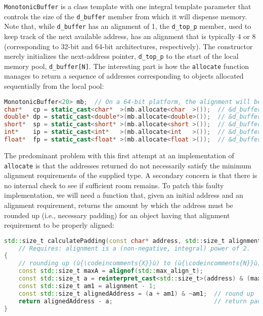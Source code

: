 \noindent \texttt{MonotonicBuffer} is a class template with one integral template
parameter that controls the size of the \texttt{d\_buffer} member from
which it will dispense memory. Note that, while \texttt{d\_buffer} has
an alignment of 1, the \texttt{d\_top\_p} member, used to keep track of
the next available address, has an alignment that is typically 4 or 8
(corresponding to 32-bit and 64-bit architectures, respectively). The
constructor merely initializes the next-address pointer,
\texttt{d\_top\_p} to the start of the local memory pool,
\texttt{d\_buffer[N]}. The interesting part is how the \texttt{allocate}
function manages to return a sequence of addresses corresponding to
objects allocated sequentially from the local pool:

\begin{lstlisting}[language=C++]
MonotonicBuffer<20> mb;  // On a 64-bit platform, the alignment will be 8.
char*   cp = static_cast<char*  >(mb.allocate<char  >());  // &d_buffer[ 0]
double* dp = static_cast<double*>(mb.allocate<double>());  // &d_buffer[ 1]
short*  sp = static_cast<short* >(mb.allocate<short >());  // &d_buffer[ 9]
int*    ip = static_cast<int*   >(mb.allocate<int   >());  // &d_buffer[11]
float*  fp = static_cast<float* >(mb.allocate<float >());  // &d_buffer[15]
\end{lstlisting}
    
\noindent The predominant problem with this first attempt at an implementation of
\texttt{allocate} is that the addresses returned do not necessarily
satisfy the minimum alignment requirements of the supplied type. A
secondary concern is that there is no internal check to see if
sufficient room remains. To patch this faulty implementation,
we will need a function that, given an initial address and an alignment
requirement, returns the amount by which the address must be rounded up
(i.e., necessary padding) for an object having that alignment
requirement to be properly aligned:

\begin{lstlisting}[language=C++]
std::size_t calculatePadding(const char* address, std::size_t alignment)
    // Requires: alignment is a (non-negative, integral) power of 2.
{
    // rounding up (ù{\codeincomments{X}}ù) to (ù{\codeincomments{N}}ù) (where (ù{\codeincomments{N}}ù) is a power of 2): (ù{\codeincomments{(x + N - 1) \& \textasciitilde(N - 1)}}ù)
    const std::size_t maxA = alignof(std::max_align_t);
    const std::size_t a = reinterpret_cast<std::size_t>(address) & (maxA - 1);
    const std::size_t am1 = alignment - 1;
    const std::size_t alignedAddress = (a + am1) & ~am1;  // round up
    return alignedAddress - a;                            // return padding
}
\end{lstlisting}
    
